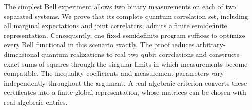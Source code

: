 The simplest Bell experiment allows two binary measurements on each of two separated systems. We prove that its complete quantum correlation set, including all marginal expectations and joint correlators, admits a finite semidefinite representation. Consequently, one fixed semidefinite program suffices to optimize every Bell functional in this scenario exactly. The proof reduces arbitrary-dimensional quantum realizations to real two-qubit correlations and constructs exact sums of squares through the singular limits in which measurements become compatible. The inequality coefficients and measurement parameters vary independently throughout the argument. A real-algebraic criterion converts these certificates into a finite global representation, whose matrices can be chosen with real algebraic entries.
